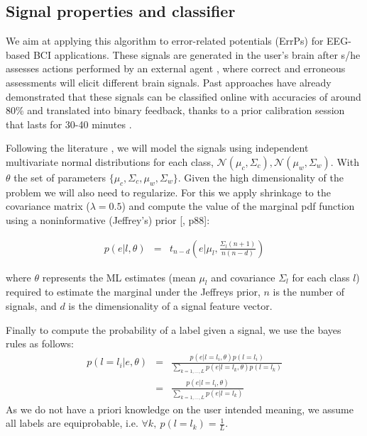 \subsection{Signal properties and classifier}

We aim at applying this algorithm to error-related potentials (ErrPs) for EEG-based BCI applications. These signals are generated in the user's brain after s/he assesses actions performed by an external agent \cite{chavarriaga2010learning}, where correct and erroneous assessments will elicit different brain signals. Past approaches have already demonstrated that these signals can be classified online with accuracies of around 80\% and translated into binary feedback, thanks to a prior calibration session that lasts for 30-40 minutes \cite{chavarriaga2010learning, iturrate2013task}.

Following the literature \cite{lotte2007review,blankertz2010single}, we will model the signals using independent multivariate normal distributions for each class, $\mathcal{N}(\mu_c, \Sigma_c), \mathcal{N}(\mu_w, \Sigma_w)$. With $\theta$ the set of parameters $\{\mu_c, \Sigma_c,\mu_w, \Sigma_w\}$. Given the high dimensionality of the problem we will also need to regularize. For this we apply shrinkage to the covariance matrix ($\lambda = 0.5$) and compute the value of the marginal pdf function using a noninformative (Jeffrey's) prior [\cite{gelman2003bayesian}, p88]:

\begin{eqnarray}
p(e|l, \theta) & = & t_{n-d}(e | \mu_l,\frac{\Sigma_l (n+1)}{n(n-d)})
\label{eq:prior}
\end{eqnarray}

where $\theta$ represents the ML estimates (mean $\mu_l$ and covariance $\Sigma_l$ for each class $l$) required to estimate the marginal under the Jeffreys prior, $n$ is the number of signals, and $d$ is the dimensionality of a signal feature vector.

Finally to compute the probability of a label given a signal, we use the bayes rules as follows: 
%
\begin{eqnarray}
    p(l = l_i|e,\theta) &=& \frac{p(e|l = l_i, \theta)p(l = l_i)}{\sum_{k = 1,\ldots, L}{p(e|l = l_k,\theta)p(l = l_k)}}\nonumber \\
    &=& \frac{p(e|l=l_i, \theta)}{\sum_{k = 1,\ldots, L} p(e|l=l_k)} \nonumber
\end{eqnarray}
%
As we do not have a priori knowledge on the user intended meaning, we assume all labels are equiprobable, i.e. $\forall k,~p(l = l_k) = \frac{1}{L}$.

